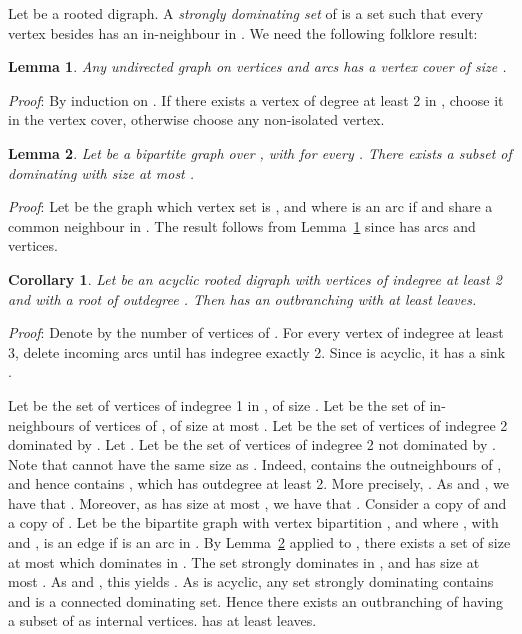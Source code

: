 \documentclass{article}
\newtheorem{lemma}{Lemma}
\newtheorem{coro}{Corollary}
\begin{document}
Let  be a rooted digraph. A \emph{strongly dominating set} of  is a set  such that every vertex besides  has an in-neighbour in .
We need the following folklore result:
\begin{lemma}\label{domi1}
Any undirected graph  on  vertices and  arcs has a vertex cover of size .
\end{lemma}
\emph{Proof}: By induction on . If there exists a vertex of degree at least 2 in , choose it in the vertex cover, otherwise choose any non-isolated vertex.


\begin{lemma}\label{domi2}
Let  be a bipartite graph over , with  for every . There exists a subset of  dominating  with size at most .
\end{lemma}
\emph{Proof}:
Let  be the graph which vertex set is , and where  is an arc if  and  share a common neighbour in . The result follows from Lemma~\ref{domi1} since  has  arcs and  vertices.



\begin{coro}\label{leaves}
Let  be an acyclic rooted digraph with  vertices of indegree at least 2 and with a root of outdegree . Then  has an outbranching with at least  leaves.
\end{coro}
\emph{Proof}: Denote by  the number of vertices of . For every vertex  of indegree at least 3, delete incoming arcs until  has indegree exactly 2. Since  is acyclic, it has a sink . 

Let  be the set of vertices of indegree 1 in , of size . Let  be the set of in-neighbours of vertices of , of size at most . Let  be the set of vertices of indegree 2 dominated by . Let . Let  be the set of vertices of indegree 2 not dominated by . Note that  cannot have the same size as . Indeed,  contains the outneighbours of , and hence  contains , which has outdegree at least 2. More precisely, . As  and , we have that . Moreover, as  has size at most , we have that . Consider a copy  of  and a copy  of . Let  be the bipartite graph with vertex bipartition , and where , with  and , is an edge if  is an arc in . By Lemma~\ref{domi2} applied to , there exists a set  of size at most  which dominates  in . The set  strongly dominates  in , and has size at most . As  and , this yields . As  is acyclic, any set strongly dominating  contains  and is a connected dominating set. Hence there exists an outbranching  of  having a subset of  as internal vertices.  has at least  leaves. 


\\
\end{document}
